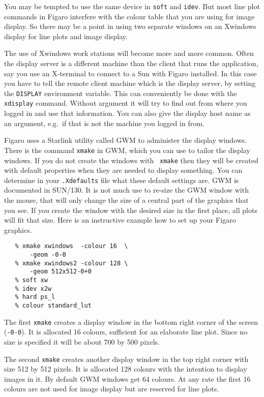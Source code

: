 You may be tempted to use the same device in {\tt soft} and {\tt idev}.
But most line plot commands in Figaro interfere with the colour table
that you are using for image display.  So there may be a point in using
two separate windows on an Xwindows display for line plots and image
display.

The use of Xwindows work stations will become more and more common.
Often the display server is a different machine than the client that
runs the application, say you use an X-terminal to connect to a Sun with
Figaro installed.  In this case you have to tell the remote client
machine which is the display server, by setting the {\tt DISPLAY}
environment variable.  This can conveniently be done with the {\tt
xdisplay} command.  Without argument it will try to find out from where
you logged in and use that information.  You can also give the display
host name as an argument, e.g.\ if that is not the machine you logged in
from.

Figaro uses a Starlink utility called GWM to administer the display
windows.  There is the command {\tt xmake} in GWM, which you can use to
tailor the display windows.  If you do not create the windows with {\tt
xmake} then they will be created with default properties when they are
needed to display something.  You can determine in your {\tt .Xdefaults}
file what these default settings are.  GWM is documented in SUN/130.
It is not much use to re-size the GWM window with the mouse, that will
only change the size of a central part of the graphics that you see.  If
you create the window with the desired size in the first place, all
plots will fit that size.
Here is an instructive example how to set up your Figaro graphics.

\begin{verbatim}
   % xmake xwindows  -colour 16  \
       -geom -0-0
   % xmake xwindows2 -colour 128 \
       -geom 512x512-0+0
   % soft xw
   % idev x2w
   % hard ps_l
   % colour standard_lut
\end{verbatim}

The first {\tt xmake} creates a display window in the bottom right
corner of the screen ({\tt -0-0}).  It is allocated 16 colours,
sufficient for an elaborate line plot.  Since no size is specified it
will be about 700 by 500 pixels.

The second {\tt xmake} creates another display window in the top right
corner with size 512 by 512 pixels.  It is allocated 128 colours with the
intention to display images in it.  By default GWM windows get 64
colours.  At any rate the first 16 colours are not used for image
display but are reserved for line plots.

